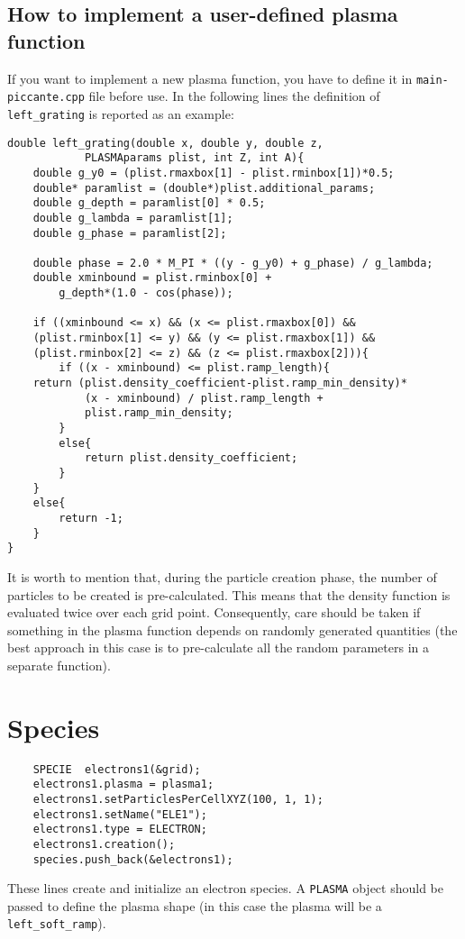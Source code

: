 \documentclass[11pt,a4paper]{report}
\begin{document}
\subsection{How to implement a user-defined plasma function}\label{subsection_upfunc}
If you want to implement a new plasma function, you have to define it in \verb+main-piccante.cpp+ file before use. In the following lines the definition of \verb+left_grating+ is reported as an example: 
\begin{lstlisting}
double left_grating(double x, double y, double z, 
			PLASMAparams plist, int Z, int A){
	double g_y0 = (plist.rmaxbox[1] - plist.rminbox[1])*0.5;
	double* paramlist = (double*)plist.additional_params;
	double g_depth = paramlist[0] * 0.5;
	double g_lambda = paramlist[1];
	double g_phase = paramlist[2];

	double phase = 2.0 * M_PI * ((y - g_y0) + g_phase) / g_lambda;
	double xminbound = plist.rminbox[0] + 
		g_depth*(1.0 - cos(phase));

	if ((xminbound <= x) && (x <= plist.rmaxbox[0]) &&
	(plist.rminbox[1] <= y) && (y <= plist.rmaxbox[1]) &&
	(plist.rminbox[2] <= z) && (z <= plist.rmaxbox[2])){
		if ((x - xminbound) <= plist.ramp_length){
	return (plist.density_coefficient-plist.ramp_min_density)*
			(x - xminbound) / plist.ramp_length + 
			plist.ramp_min_density;
		}
		else{
			return plist.density_coefficient;
		}
	}
	else{
		return -1;
	}
}
\end{lstlisting}
It is worth to mention that, during the particle creation phase, the number of particles to be created is pre-calculated. This means that the density function is evaluated twice over each grid point. Consequently, care should be taken if something in the plasma function depends on randomly generated quantities (the best approach in this case is to pre-calculate all the random parameters in a separate function).

\section{Species}\label{section_species}
\begin{lstlisting}
	SPECIE  electrons1(&grid);
	electrons1.plasma = plasma1;
	electrons1.setParticlesPerCellXYZ(100, 1, 1);       
	electrons1.setName("ELE1");
	electrons1.type = ELECTRON;
	electrons1.creation();                            
	species.push_back(&electrons1);
\end{lstlisting}
These lines create and initialize an electron species. A \verb+PLASMA+ object should be passed to define the plasma shape (in this case the plasma will be a \verb+left_soft_ramp+).
\end{document}
